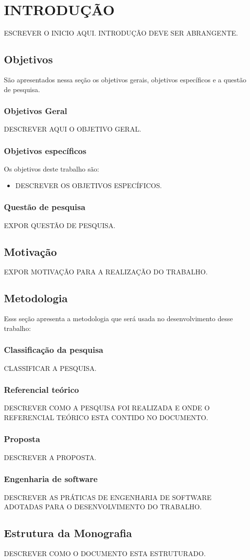 \chapter[INTRODUÇÃO]{INTRODUÇÃO}

ESCREVER O INICIO AQUI. INTRODUÇÃO DEVE SER ABRANGENTE.

\section{Objetivos}

São apresentados nessa seção os objetivos gerais, objetivos específicos e a questão de pesquisa.

\subsection{Objetivos Geral}
DESCREVER AQUI O OBJETIVO GERAL.
\subsection{Objetivos específicos}
Os objetivos deste trabalho são:
\begin{itemize}
\item DESCREVER OS OBJETIVOS ESPECÍFICOS.
\end{itemize}
\subsection{Questão de pesquisa}
EXPOR QUESTÃO DE PESQUISA.
\section{Motivação}

EXPOR MOTIVAÇÃO PARA A REALIZAÇÃO DO TRABALHO.

\section{Metodologia}

Esss seção apresenta a metodologia que será usada no desenvolvimento desse trabalho: 

\subsection{Classificação da pesquisa}
CLASSIFICAR A PESQUISA.

\subsection{Referencial teórico}
DESCREVER COMO A PESQUISA FOI REALIZADA E ONDE O REFERENCIAL TEÓRICO ESTA CONTIDO NO DOCUMENTO.

\subsection{Proposta}
DESCREVER A PROPOSTA.

\subsection{Engenharia de software}
DESCREVER AS PRÁTICAS DE ENGENHARIA DE SOFTWARE ADOTADAS PARA O DESENVOLVIMENTO DO TRABALHO.

\section{Estrutura da Monografia}
DESCREVER COMO O DOCUMENTO ESTA ESTRUTURADO.


